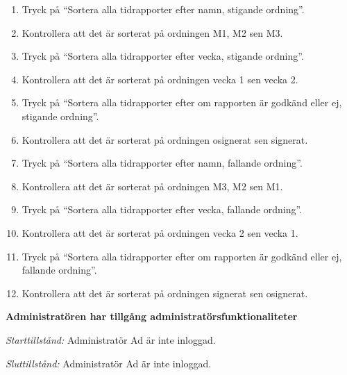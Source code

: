 \documentclass[a4paper]{article}
\begin{document}
\begin{ST}
\begin{enumerate}
\item Tryck på ``Sortera alla tidrapporter efter namn, stigande ordning''.
\item Kontrollera att det är sorterat på ordningen M1, M2 sen M3.
\item Tryck på ``Sortera alla tidrapporter efter vecka, stigande ordning''.
\item Kontrollera att det är sorterat på ordningen vecka 1 sen vecka 2.
\item Tryck på ``Sortera alla tidrapporter efter om rapporten är godkänd eller ej, stigande ordning''.
\item Kontrollera att det är sorterat på ordningen osignerat sen signerat.
\item Tryck på ``Sortera alla tidrapporter efter namn, fallande ordning''.
\item Kontrollera att det är sorterat på ordningen M3, M2 sen M1.
\item Tryck på ``Sortera alla tidrapporter efter vecka, fallande ordning''.
\item Kontrollera att det är sorterat på ordningen vecka 2 sen vecka 1.
\item Tryck på ``Sortera alla tidrapporter efter om rapporten är godkänd eller ej, fallande ordning''.
\item Kontrollera att det är sorterat på ordningen signerat sen osignerat.
\end{enumerate}

\item \textbf{Administratören har tillgång administratörsfunktionaliteter} 

\emph{Starttillstånd:} Administratör Ad är inte inloggad.

\emph{Sluttillstånd:} Administratör Ad är inte inloggad.


\end{ST}
\end{document}
